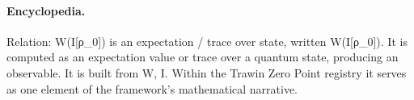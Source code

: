 \paragraph{Encyclopedia.}
Relation: W(I[ρ\_0]) is an expectation / trace over state, written W(I[ρ\_0]). It is computed as an expectation value or trace over a quantum state, producing an observable. It is built from W, I. Within the Trawin Zero Point registry it serves as one element of the framework's mathematical narrative.
